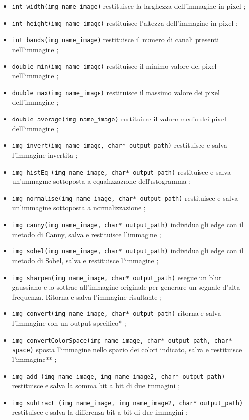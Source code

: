 \documentclass[10pt]{article}
\begin{document}
\begin{itemize}
\item \texttt{int width(img name\_image)} restituisce la larghezza dell’immagine in pixel ;
\item \texttt{int height(img name\_image)} restituisce l'altezza dell’immagine in pixel ;
\item \texttt{int bands(img name\_image)} restituisce il numero di canali presenti nell’immagine ;
\item \texttt{double min(img name\_image)} restituisce il minimo valore dei pixel nell’immagine ;
\item \texttt{double max(img name\_image)} restituisce il massimo valore dei pixel dell’immagine ;	
\item \texttt{double average(img name\_image)} restituisce il valore medio dei pixel dell’immagine ;
\item \texttt{img invert(img name\_image, char* output\_path)} restituisce e salva l'immagine invertita ;
\item \texttt{img histEq (img name\_image, char* output\_path)} restituisce e salva un’immagine sottoposta a equalizzazione dell’istogramma ;
\item \texttt{img normalise(img name\_image, char* output\_path)} restituisce e salva un’immagine sottoposta a normalizzazione ;
\item \texttt{img canny(img name\_image, char* output\_path)} individua gli edge con il metodo di Canny, salva e restituisce l’immagine ;
\item \texttt{img sobel(img name\_image, char* output\_path)} individua gli edge con il metodo di Sobel, salva e restituisce l’immagine ;
\item \texttt{img sharpen(img name\_image, char* output\_path)} esegue un blur gaussiano e lo sottrae all’immagine originale per generare un segnale d’alta frequenza. Ritorna e salva l’immagine risultante ;
\item \texttt{img convert(img name\_image, char* output\_path)} ritorna e salva l’immagine con un output specifico* ;
\item \texttt{img convertColorSpace(img name\_image, char* output\_path, char* space)} sposta l'immagine nello spazio dei colori indicato, salva e restituisce l’immagine** ;
\item \texttt{img add (img name\_image, img name\_image2, char* output\_path)} restituisce e salva la somma bit a bit di due immagini ;
\item \texttt{img subtract (img name\_image, img name\_image2, char* output\_path)} restituisce e salva la differenza bit a bit di due immagini ;

\end{itemize}
\end{document}
